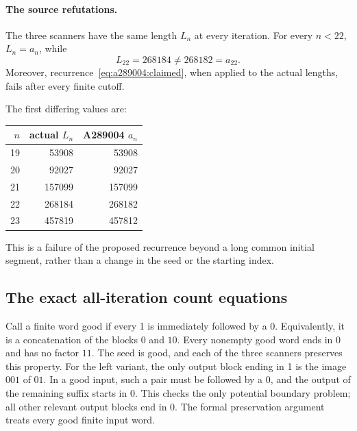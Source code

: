 \paragraph{The source refutations.}
The three scanners have the same length $L_n$ at every iteration. For
every $n<22$, $L_n=a_n$, while
\[
 L_{22}=268184\ne268182=a_{22}.
\]
Moreover, recurrence~\eqref{eq:a289004:claimed}, when applied to the actual
lengths, fails after every finite cutoff.

The first differing values are:
\begin{center}
\begin{tabular}{r|r|r}
$n$ & actual $L_n$ & A289004 $a_n$\\
\hline
19 & 53908 & 53908\\
20 & 92027 & 92027\\
21 & 157099 & 157099\\
22 & 268184 & 268182\\
23 & 457819 & 457812
\end{tabular}
\end{center}
This is a failure of the proposed recurrence beyond a long common initial
segment, rather than a change in the seed or the starting index.

\subsection{The exact all-iteration count equations}

Call a finite word good if every 1 is immediately followed by a 0.
Equivalently, it is a concatenation of the blocks $0$ and $10$.
Every nonempty good word ends in 0 and has no factor $11$.
The seed is good, and each of the three scanners preserves this property.
For the left variant, the only output block ending in 1 is the image
$001$ of $01$. In a good input, such a pair must be followed by a 0,
and the output of the remaining suffix starts in 0. This checks the only
potential boundary problem; all other relevant output blocks end in 0.
The formal preservation argument treats every good finite input word.

